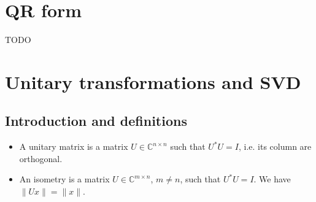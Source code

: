 \documentclass[12pt, openany]{report}
\theoremstyle{definition}
\newcommand{\C}{\mathbb{C}}
\begin{document}
\chapter{QR form}
TODO
\chapter{Unitary transformations and SVD}
\section{Introduction and definitions}
\begin{itemize}
    \item A unitary matrix is a matrix \(U\in \C^{n\times n}\) such that \(U^*U=I\), i.e. its column are orthogonal.
    \item An isometry is a matrix \(U\in \C^{m\times n}\), \(m\neq n\), such that \(U^*U=I\). We have \(\lVert Ux\rVert =\lVert x \rVert\). 
\end{itemize}
\end{document}
